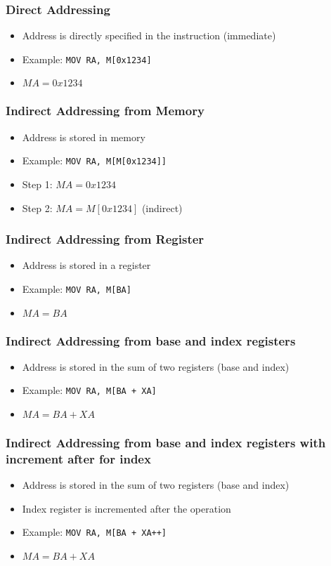 \begin{frame}
    \frametitle{Direct Addressing}
    \begin{itemize}
        \item Address is directly specified in the instruction (immediate)
        \item Example: \texttt{MOV RA, M[0x1234]}
        \item $MA = 0x1234$
    \end{itemize}
\end{frame}

\begin{frame}
    \frametitle{Indirect Addressing from Memory}
    \begin{itemize}
        \item Address is stored in memory 
        \item Example: \texttt{MOV RA, M[M[0x1234]]}
        \item Step 1: $MA = 0x1234$
        \item Step 2: $MA = M[0x1234]$ (indirect)
    \end{itemize}
\end{frame}

\begin{frame}
    \frametitle{Indirect Addressing from Register}
    \begin{itemize}
        \item Address is stored in a register
        \item Example: \texttt{MOV RA, M[BA]}
        \item $MA = BA$
    \end{itemize}
\end{frame}

\begin{frame}
    \frametitle{Indirect Addressing from base and index registers}
    \begin{itemize}
        \item Address is stored in the sum of two registers (base and index)
        \item Example: \texttt{MOV RA, M[BA + XA]}
        \item $MA = BA + XA$
    \end{itemize}
\end{frame}

\begin{frame}
    \frametitle{Indirect Addressing from base and index registers with increment after for index}
    \begin{itemize}
        \item Address is stored in the sum of two registers (base and index)
        \item Index register is incremented after the operation
        \item Example: \texttt{MOV RA, M[BA + XA++]}
        \item $MA = BA + XA$
    \end{itemize}
\end{frame}

